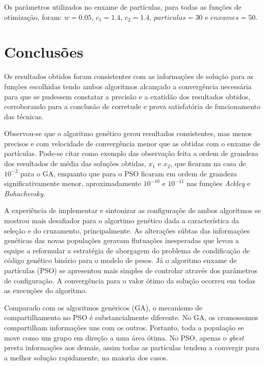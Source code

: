 \documentclass[a4paper,12pt]{article}
\begin{document}
Os parâmetros utilizados no enxame de partículas, para todas as funções de otimização, foram: $w = 0.05$, $c_1 = 1.4$, $c_2 = 1.4$, $particulas = 30$ e $enxames = 50$.


\thispagestyle{main}

\section{Conclusões}

Os resultados obtidos foram consistentes com as informações de solução para as funções escolhidas tendo ambos algoritmos alcançado a convergência necessária para que se pudessem constatar a precisão e a exatidão dos resultados obtidos, corroborando para a conclusão de corretude e prova satisfatória de funcionamento das técnicas.

Observou-se que o algoritmo genético gerou resultados consistentes, mas menos precisos e com velocidade de convergência menor que as obtidas com o enxame de partículas. Pode-se citar como exemplo das observação feita a ordem de grandeza dos resultados de média das soluções obtidas, $x_1$ e $x_2$, que ficaram na casa de $10^{-2}$ para o GA, enquanto que para o PSO ficaram em ordem de grandeza significativamente menor, aproximadamente $10^{-10}$ e $10^{-11}$ nas funções \emph{Ackley} e \emph{Bohachevsky}.

A experiência de implementar e sintonizar as configuraçõe de ambos algoritmos se mostrou mais desafiador para o algortimo genético dada a característica da seleção e do cruzamento, principalmente. As alterações súbtas das informações genéticas das novas populações geravam flutuações inesperadas que levou a equipe a reformular a estratégia de aborgagem do problema de condificação de código genético binário para o modelo de pesos. Já o algoritmo enxame de partículas (PSO) se apresentou mais simples de controlar através dos parâmetros de configuração. A convergência para o valor ótimo da solução ocorreu em todas as execuções do algoritmo.

Comparado com os algoritmos genéricos (GA), o mecanismo de compartilhamento no PSO é substancialmente diferente. No GA, os cromossomos compartilham informações uns com os outros. Portanto, toda a população se move como um grupo em direção a uma área ótima. No PSO, apenas o \emph{\emph{gbest}} presta informações aos demais, assim todas as partículas tendem a convergir para a melhor solução rapidamente, na maioria dos casos.
\end{document}
